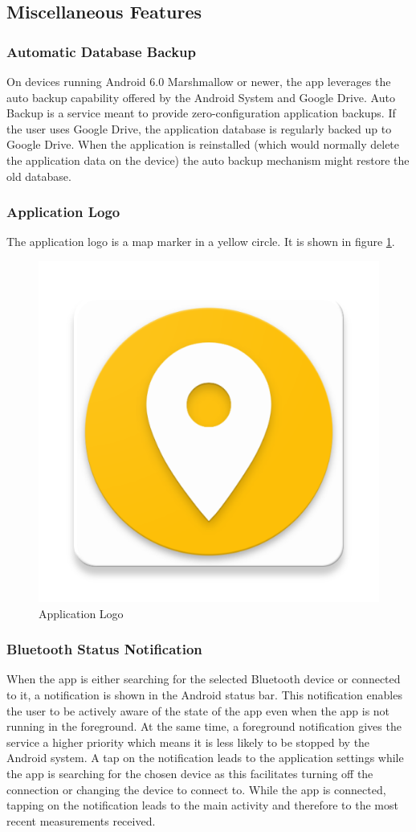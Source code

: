\subsection{Miscellaneous Features}
\subsubsection{Automatic Database Backup}
On devices running Android 6.0 Marshmallow or newer, the app leverages the auto backup capability offered by the Android System and Google Drive. Auto Backup is a service meant to provide zero-configuration application backups. If the user uses Google Drive, the application database is regularly backed up to Google Drive. When the application is reinstalled (which would normally delete the application data on the device) the auto backup mechanism might restore the old database.

\subsubsection{Application Logo}
The application logo is a map marker in a yellow circle. It is shown in figure \ref{fig:logo}.

\begin{figure}[h]
\centering
\includegraphics[width=.2\linewidth]{src/logo.png}
\caption{Application Logo}
\label{fig:logo}
\end{figure}

\subsubsection{Bluetooth Status Notification}
When the app is either searching for the selected Bluetooth device or connected to it, a notification is shown in the Android status bar. This notification enables the user to be actively aware of the state of the app even when the app is not running in the foreground. At the same time, a foreground notification gives the service a higher priority which means it is less likely to be stopped by the Android system. A tap on the notification leads to the application settings while the app is searching for the chosen device as this facilitates turning off the connection or changing the device to connect to. While the app is connected, tapping on the notification leads to the main activity and therefore to the most recent measurements received.

